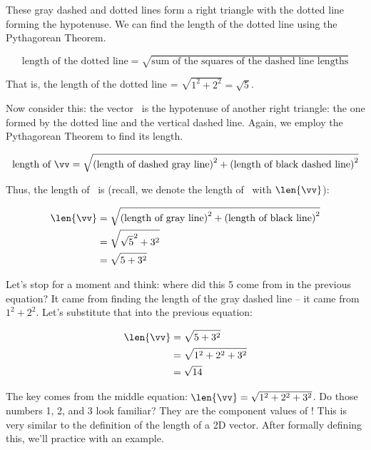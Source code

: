 These gray dashed and dotted lines form a right triangle with the dotted line forming the hypotenuse. We can find the length of the dotted line using the Pythagorean Theorem. 

\[
\text{length of the dotted line} = \sqrt{ \text{sum of the squares of the dashed line lengths}}
\]

That is, the length of the dotted line = $\sqrt{1^2 + 2^2} = \sqrt{5}$.

Now consider this: the vector \vv\ is the hypotenuse of another right triangle: the one formed by the dotted line and the vertical dashed line. Again, we employ the Pythagorean Theorem to find its length.

\[
\text{length of } \vv = \sqrt{ \text{(length of dashed gray line)}^2 + \text{(length of black dashed line)}^2}
\]

Thus, the length of \vv\ is (recall, we denote the length of \vv\ with $\len{\vv}$):

\begin{align*}
\len{\vv} &= \sqrt{\text{(length of gray line)}^2 + \text{(length of black line)}^2} \\
				&= \sqrt{ \sqrt{5}^2 + 3^2}\\
				&= \sqrt{ 5 + 3^2}\\
\end{align*}

Let's stop for a moment and think: where did this 5 come from in the previous equation? It came from finding the length of the gray dashed line -- it came from $1^2+2^2$. Let's substitute that into the previous equation:

\begin{align*}
\len{\vv}	&= \sqrt{5+ 3^2} \\
				&= \sqrt{1^2+2^2+3^2}\\
				&= \sqrt{14}\\
\end{align*}

The key comes from the middle equation: $\len{\vv} = \sqrt{1^2+2^2+3^2}$. Do those numbers 1, 2, and 3 look familiar? They are the component values of \vv! This is very similar to the definition of the length of a 2D vector. After formally defining this, we'll practice with an example.

\smallskip


